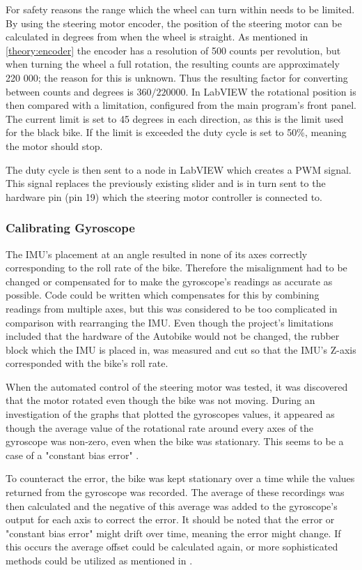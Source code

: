 For safety reasons the range which the wheel can turn within needs to be limited. By using the steering motor encoder, the position of the steering motor can be calculated in degrees from when the wheel is straight. As mentioned in \ref{theory:encoder} the encoder has a resolution of 500 counts per revolution, but when turning the wheel a full rotation, the resulting counts are approximately 220 000; the reason for this is unknown. Thus the resulting factor for converting between counts and degrees is $360 / 220000$. In LabVIEW the rotational position is then compared with a limitation, configured from the main program's front panel. The current limit is set to 45 degrees in each direction, as this is the limit used for the black bike. If the limit is exceeded the duty cycle is set to 50\%, meaning the motor should stop.
 
The duty cycle is then sent to a node in LabVIEW which creates a PWM signal. This signal replaces the previously existing slider and is in turn sent to the hardware pin (pin 19) which the steering motor controller is connected to.

\subsubsection{Calibrating Gyroscope}

The IMU's placement at an angle resulted in none of its axes correctly corresponding to the roll rate of the bike. Therefore the misalignment had to be changed or compensated for to make the gyroscope's readings as accurate as possible. Code could be written which compensates for this by combining readings from multiple axes, but this was considered to be too complicated in comparison with rearranging the IMU. Even though the project's limitations included that the hardware of the Autobike would not be changed, the rubber block which the IMU is placed in, was measured and cut so that the IMU's Z-axis corresponded with the bike's roll rate.

When the automated control of the steering motor was tested, it was discovered that the motor rotated even though the bike was not moving. During an investigation of the graphs that plotted the gyroscopes values, it appeared as though the average value of the rotational rate around every axes of the gyroscope was non-zero, even when the bike was stationary. This seems to be a case of a "constant bias error" \cite{Beavers2017TheGyro}.

To counteract the error, the bike was kept stationary over a time while the values returned from the gyroscope was recorded. The average of these recordings was then calculated and the negative of this average was added to the gyroscope's output for each axis to correct the error. It should be noted that the error or "constant bias error" might drift over time, meaning the error might change. If this occurs the average offset could be calculated again, or more sophisticated methods could be utilized as mentioned in \cite{Beavers2017TheGyro}.

